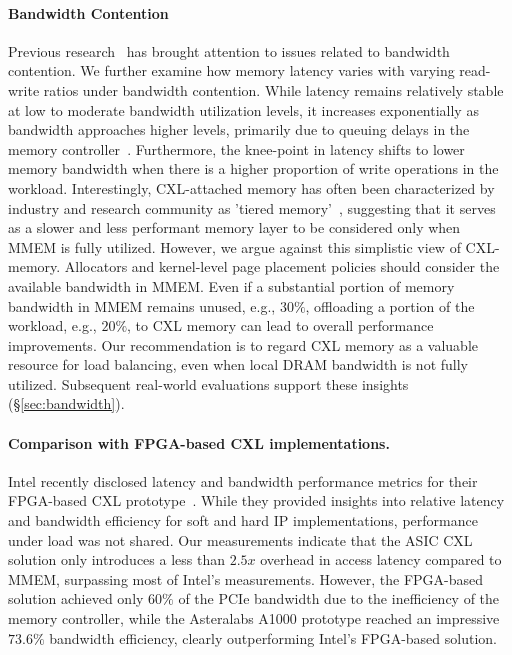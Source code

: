 \paragraph{Bandwidth Contention}
Previous research~\cite{mt2, cxlcentric} has brought attention to issues related to bandwidth contention. We further examine how memory latency varies with varying read-write ratios under bandwidth contention. While latency remains relatively stable at low to moderate bandwidth utilization levels, it increases exponentially as bandwidth approaches higher levels, primarily due to queuing delays in the memory controller~\cite{cxl-centric}. Furthermore, the knee-point in latency shifts to lower memory bandwidth when there is a higher proportion of write operations in the workload. Interestingly, CXL-attached memory has often been characterized by industry and research community as 'tiered memory'~\cite{demystify, tpppatch, Interleavepatch}, suggesting that it serves as a slower and less performant memory layer to be considered only when MMEM is fully utilized.
However, we argue against this simplistic view of CXL-memory. Allocators and kernel-level page placement policies should consider the available bandwidth in MMEM.
Even if a substantial portion of memory bandwidth in MMEM remains unused, e.g., $30\%$, offloading a portion of the workload, e.g., $20\%$, to CXL memory can lead to overall performance improvements. 
Our recommendation is to regard CXL memory as a valuable resource for load balancing, even when local DRAM bandwidth is not fully utilized. Subsequent real-world evaluations support these insights (\S\ref{sec:bandwidth}).

\paragraph{Comparison with FPGA-based CXL implementations.}
Intel recently disclosed latency and bandwidth performance metrics for their FPGA-based CXL prototype~\cite{demystify}. While they provided insights into relative latency and bandwidth efficiency for soft and hard IP implementations, performance under load was not shared. Our measurements indicate that the ASIC CXL solution only introduces a less than $2.5x$ overhead in access latency compared to MMEM, surpassing most of Intel's measurements. However, the FPGA-based solution achieved only $60\%$ of the PCIe bandwidth due to the inefficiency of the memory controller, while the Asteralabs A1000 prototype reached an impressive $73.6\%$ bandwidth efficiency, clearly outperforming Intel's FPGA-based solution.

